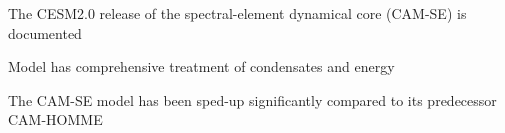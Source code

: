 \documentclass{agujournal}
\begin{document}









\begin{keypoints}
\item The CESM2.0 release of the spectral-element dynamical core (CAM-SE) is documented
\item Model has comprehensive treatment of condensates and energy
\item The CAM-SE model has been sped-up significantly compared to its predecessor CAM-HOMME
\end{keypoints}

%
%
\end{document}
